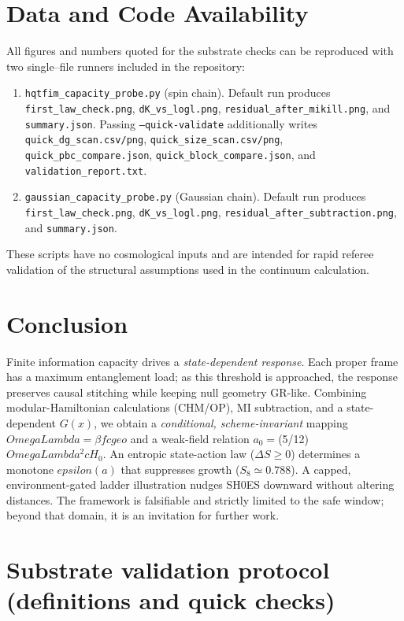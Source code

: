 \documentclass[aps,prd,onecolumn,superscriptaddress,nofootinbib]{revtex4-2}
\def\OmL{OmegaLambda}%
\def\cgeo{cgeo}%
\def\eps{epsilon}%
\newcommand{\OmL}{\Omega_\Lambda}
\newcommand{\cgeo}{c_{\rm geo}}
\newcommand{\eps}{\varepsilon}
\begin{document}
\section{Data and Code Availability}
\label{sec:data-code}
All figures and numbers quoted for the substrate checks can be reproduced with two single–file runners included in the repository:
\begin{enumerate}[leftmargin=1.3em]
\item \texttt{hqtfim\_capacity\_probe.py} (spin chain). Default run produces \texttt{first\_law\_check.png}, \texttt{dK\_vs\_logl.png}, \texttt{residual\_after\_mikill.png}, and \texttt{summary.json}. Passing \texttt{--quick-validate} additionally writes \texttt{quick\_dg\_scan.csv/png}, \texttt{quick\_size\_scan.csv/png}, \texttt{quick\_pbc\_compare.json}, \texttt{quick\_block\_compare.json}, and \texttt{validation\_report.txt}.
\item \texttt{gaussian\_capacity\_probe.py} (Gaussian chain). Default run produces \texttt{first\_law\_check.png}, \texttt{dK\_vs\_logl.png}, \texttt{residual\_after\_subtraction.png}, and \texttt{summary.json}.
\end{enumerate}
These scripts have no cosmological inputs and are intended for rapid referee validation of the structural assumptions used in the continuum calculation.

\section{Conclusion}
Finite information capacity drives a \emph{state-dependent response}. Each proper frame has a maximum entanglement load; as this threshold is approached, the response preserves causal stitching while keeping null geometry GR-like. Combining modular-Hamiltonian calculations (CHM/OP), MI subtraction, and a state-dependent $G(x)$, we obtain a \emph{conditional, scheme-invariant} mapping $\OmL=\beta f \cgeo$ and a weak-field relation $a_0=$(5/12)\,$\OmL^2 cH_0$. An entropic state-action law ($\Delta S\ge 0$) determines a monotone $\eps(a)$ that suppresses growth ($S_8\simeq 0.788$). A capped, environment-gated ladder illustration nudges SH0ES downward without altering distances. The framework is falsifiable and strictly limited to the safe window; beyond that domain, it is an invitation for further work.

\appendix

\section{Substrate validation protocol (definitions and quick checks)}
\label{app:substrate-protocol}
\end{document}
